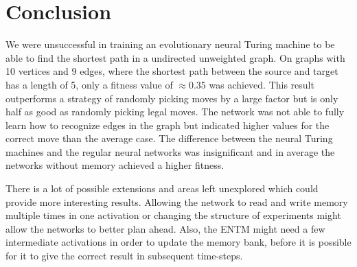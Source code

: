 
\section{Conclusion}
We were unsuccessful in training an evolutionary neural Turing machine to be able to find the shortest path in a undirected unweighted graph. On graphs with 10 vertices and 9 edges, where the shortest path between the source and target has a length of 5, only a fitness value of $\approx0.35 $ was achieved. This result outperforms a strategy of randomly picking moves by a large factor but is only half as good as randomly picking legal moves. The network was not able to fully learn how to recognize edges in the graph but indicated higher values for the correct move than the average case. 
The difference between the neural Turing machines and the regular neural networks was insignificant and in average the networks without memory achieved a higher fitness. 

\newpar There is a lot of possible extensions and areas left unexplored which could provide more interesting results. Allowing the network to read and write memory multiple times in one activation or changing the structure of experiments might allow the networks to better plan ahead. Also, the ENTM might need a few intermediate activations in order to update the memory bank, before it is possible for it to give the correct result in subsequent time-steps.